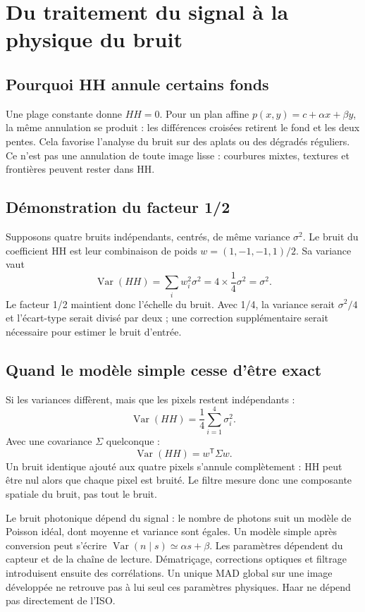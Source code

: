 \section{Du traitement du signal à la physique du bruit}
\subsection{Pourquoi HH annule certains fonds}
Une plage constante donne $HH=0$. Pour un plan affine
$p(x,y)=c+\alpha x+\beta y$, la même annulation se produit :
les différences croisées retirent le fond et les deux pentes.
Cela favorise l'analyse du bruit sur des aplats ou des dégradés réguliers.
Ce n'est pas une annulation de toute image lisse : courbures mixtes,
textures et frontières peuvent rester dans HH.

\subsection{Démonstration du facteur 1/2}
Supposons quatre bruits indépendants, centrés, de même variance $\sigma^2$.
Le bruit du coefficient HH est leur combinaison de poids
$w=(1,-1,-1,1)/2$. Sa variance vaut
\begin{equation}
\operatorname{Var}(HH)=\sum_i w_i^2\sigma^2
=4\times\frac14\sigma^2=\sigma^2.
\end{equation}
Le facteur 1/2 maintient donc l'échelle du bruit. Avec 1/4, la variance
serait $\sigma^2/4$ et l'écart-type serait divisé par deux ; une correction
supplémentaire serait nécessaire pour estimer le bruit d'entrée.

\subsection{Quand le modèle simple cesse d'être exact}
Si les variances diffèrent, mais que les pixels restent indépendants :
\begin{equation}
\operatorname{Var}(HH)=\frac14\sum_{i=1}^4\sigma_i^2.
\end{equation}
Avec une covariance $\Sigma$ quelconque :
\begin{equation}
\operatorname{Var}(HH)=w^{\mathsf T}\Sigma w.
\end{equation}
Un bruit identique ajouté aux quatre pixels s'annule complètement :
HH peut être nul alors que chaque pixel est bruité.
Le filtre mesure donc une composante spatiale du bruit, pas tout le bruit.

Le bruit photonique dépend du signal : le nombre de photons suit un modèle
de Poisson idéal, dont moyenne et variance sont égales. Un modèle simple
après conversion peut s'écrire $\operatorname{Var}(n\mid s)\simeq\alpha s+\beta$.
Les paramètres dépendent du capteur et de la chaîne de lecture. Dématriçage,
corrections optiques et filtrage introduisent ensuite des corrélations.
Un unique MAD global sur une image développée ne retrouve pas à lui seul
ces paramètres physiques. Haar ne dépend pas directement de l'ISO.


